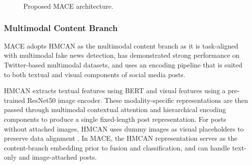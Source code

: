 \begin{figure}[htbp]
{%
}
\caption{Proposed MACE architecture.}
\label{fig:mace_architecture}
\end{figure}

\subsubsection{Multimodal Content Branch}

MACE adopts HMCAN as the multimodal content branch \citep{Qian2021} as it is task-aligned with multimodal fake news detection, has demonstrated strong performance on Twitter-based multimodal datasets, and uses an encoding pipeline that is suited to both textual and visual components of social media posts.

HMCAN extracts textual features using BERT and visual features using a pre-trained ResNet50 image encoder. These modality-specific representations are then passed through multimodal contextual attention and hierarchical encoding components to produce a single fixed-length post representation. For posts without attached images, HMCAN uses dummy images as visual placeholders to preserve data alignment \citep{Qian2021}. In MACE, the HMCAN representation serves as the content-branch embedding prior to fusion and classification, and can handle text-only and image-attached posts.

